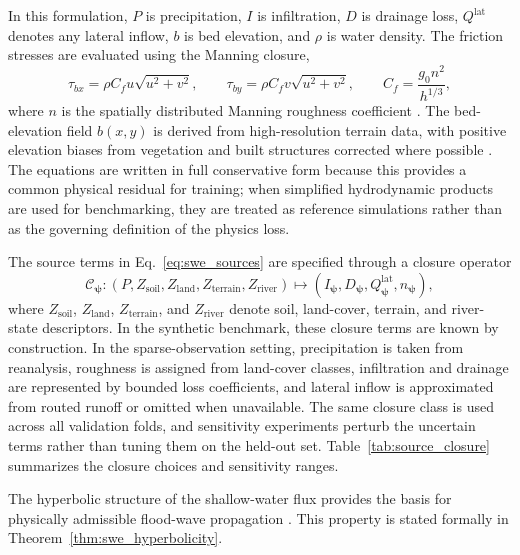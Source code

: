 \documentclass[pdflatex,sn-mathphys-ay]{sn-jnl}
\theoremstyle{thmstyleone}
\begin{document}
In this formulation, $P$ is precipitation, $I$ is infiltration, $D$ is
drainage loss, $Q^{\mathrm{lat}}$ denotes any lateral inflow, $b$ is
bed elevation, and $\rho$ is water density.  The friction stresses are
evaluated using the Manning closure,
\begin{equation}
  \tau_{bx}
  =
  \rho C_f u\sqrt{u^2+v^2},
  \qquad
  \tau_{by}
  =
  \rho C_f v\sqrt{u^2+v^2},
  \qquad
  C_f
  =
  \frac{g_{0}n^2}{h^{1/3}},
  \label{eq:manning}
\end{equation}
where $n$ is the spatially distributed Manning roughness coefficient
\citep{Akan2006,Arcement1989,Almeida2013,Xia2017}.  The bed-elevation field $b(x,y)$ is
derived from high-resolution terrain data, with positive elevation
biases from vegetation and built structures corrected where possible
\citep{Farr2007,Yamazaki2017,Hawker2022}.  The equations are written in full
conservative form because this provides a common physical residual for
training; when simplified hydrodynamic products are used for
benchmarking, they are treated as reference simulations rather than as
the governing definition of the physics loss.

The source terms in Eq.~\eqref{eq:swe_sources} are specified through a
closure operator
\begin{equation}
  \mathcal{C}_{\boldsymbol{\psi}}
  :
  \left(
    P,
    Z_{\mathrm{soil}},
    Z_{\mathrm{land}},
    Z_{\mathrm{terrain}},
    Z_{\mathrm{river}}
  \right)
  \mapsto
  \left(
    I_{\boldsymbol{\psi}},
    D_{\boldsymbol{\psi}},
    Q^{\mathrm{lat}}_{\boldsymbol{\psi}},
    n_{\boldsymbol{\psi}}
  \right),
  \label{eq:source_closure_operator}
\end{equation}
where $Z_{\mathrm{soil}}$, $Z_{\mathrm{land}}$, $Z_{\mathrm{terrain}}$,
and $Z_{\mathrm{river}}$ denote soil, land-cover, terrain, and river-state
descriptors.  In the synthetic benchmark, these closure terms are known
by construction.  In the sparse-observation setting, precipitation is taken from
reanalysis, roughness is assigned from land-cover classes, infiltration
and drainage are represented by bounded loss coefficients, and lateral
inflow is approximated from routed runoff or omitted when unavailable.
The same closure class is used across all validation folds, and
sensitivity experiments perturb the uncertain terms rather than tuning
them on the held-out set.  Table~\ref{tab:source_closure} summarizes
the closure choices and sensitivity ranges.

The hyperbolic structure of the shallow-water flux provides the basis for physically admissible flood-wave propagation
\citep{Toro2001,Roe1981}.  This property is stated formally in
Theorem~\ref{thm:swe_hyperbolicity}.
\end{document}
